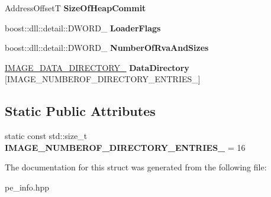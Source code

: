 \begin{DoxyCompactItemize}
\item 
Address\+OffsetT {\bfseries Size\+Of\+Heap\+Commit}\hypertarget{a00149_afb37e14279a636d93b4c748ad5e4c1b1}{}\label{a00149_afb37e14279a636d93b4c748ad5e4c1b1}

\item 
boost\+::dll\+::detail\+::\+D\+W\+O\+R\+D\+\_\+ {\bfseries Loader\+Flags}\hypertarget{a00149_a377c1c91e9fe0b9a19297b9689f9dd40}{}\label{a00149_a377c1c91e9fe0b9a19297b9689f9dd40}

\item 
boost\+::dll\+::detail\+::\+D\+W\+O\+R\+D\+\_\+ {\bfseries Number\+Of\+Rva\+And\+Sizes}\hypertarget{a00149_ad53ec3441a0a0bfe7d5518b2a4a9e0cb}{}\label{a00149_ad53ec3441a0a0bfe7d5518b2a4a9e0cb}

\item 
\hyperlink{a00144}{I\+M\+A\+G\+E\+\_\+\+D\+A\+T\+A\+\_\+\+D\+I\+R\+E\+C\+T\+O\+R\+Y\+\_\+} {\bfseries Data\+Directory} \mbox{[}I\+M\+A\+G\+E\+\_\+\+N\+U\+M\+B\+E\+R\+O\+F\+\_\+\+D\+I\+R\+E\+C\+T\+O\+R\+Y\+\_\+\+E\+N\+T\+R\+I\+E\+S\+\_\+\mbox{]}\hypertarget{a00149_a7d7188872466b668272c7daaf937b9dc}{}\label{a00149_a7d7188872466b668272c7daaf937b9dc}

\end{DoxyCompactItemize}
\subsection*{Static Public Attributes}
\begin{DoxyCompactItemize}
\item 
static const std\+::size\+\_\+t {\bfseries I\+M\+A\+G\+E\+\_\+\+N\+U\+M\+B\+E\+R\+O\+F\+\_\+\+D\+I\+R\+E\+C\+T\+O\+R\+Y\+\_\+\+E\+N\+T\+R\+I\+E\+S\+\_\+} = 16\hypertarget{a00149_a52f29423206a1a911c33714b2bb547a1}{}\label{a00149_a52f29423206a1a911c33714b2bb547a1}

\end{DoxyCompactItemize}


The documentation for this struct was generated from the following file\+:\begin{DoxyCompactItemize}
\item 
pe\+\_\+info.\+hpp\end{DoxyCompactItemize}

